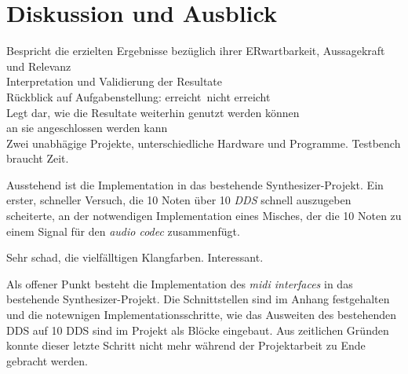 
\chapter{Diskussion und Ausblick}\label{chap.diskussion}

Bespricht die erzielten Ergebnisse bezüglich ihrer ERwartbarkeit, Aussagekraft und Relevanz\\
Interpretation und Validierung der Resultate\\
Rückblick auf Aufgabenstellung: erreicht\ nicht erreicht\\

Legt dar, wie die Resultate weiterhin genutzt werden können\\ an sie angeschlossen werden kann\\


Zwei unabhägige Projekte, unterschiedliche Hardware und Programme. Testbench braucht Zeit.

Ausstehend ist die Implementation in das bestehende Synthesizer-Projekt. Ein erster, schneller Versuch, die 10 Noten über 10 \textit{DDS} schnell auszugeben scheiterte, an der notwendigen Implementation eines Misches, der die 10 Noten zu einem Signal für den \textit{audio codec} zusammenfügt. 


Sehr schad, die vielfälltigen Klangfarben. Interessant. 






Als offener Punkt besteht die Implementation des \textit{midi interfaces} in das bestehende Synthesizer-Projekt. Die Schnittstellen sind im Anhang festgehalten und die notewnigen Implementationsschritte, wie das Ausweiten des bestehenden DDS auf 10 DDS sind im Projekt als Blöcke eingebaut. Aus zeitlichen Gründen konnte dieser letzte Schritt nicht mehr während der Projektarbeit zu Ende gebracht werden. 
